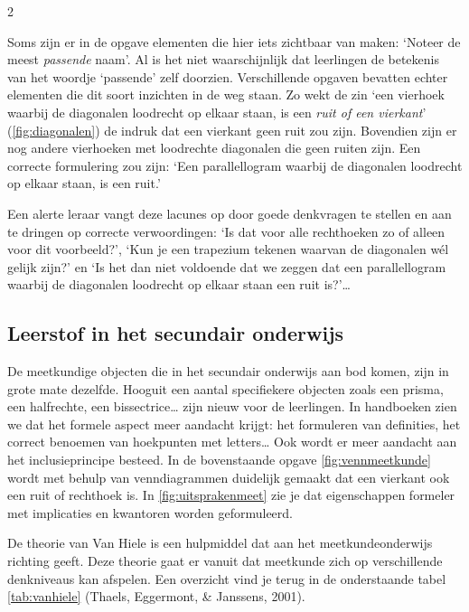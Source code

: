 \begin{multicols}{2}


Soms zijn er in de opgave elementen die hier iets zichtbaar van maken: `Noteer de meest \emph{passende} naam'.
Al is het niet waarschijnlijk dat leerlingen de betekenis van het woordje `passende' zelf doorzien.
Verschillende opgaven bevatten echter elementen die dit soort inzichten in de weg staan.
Zo wekt de zin `een vierhoek waarbij de diagonalen loodrecht op elkaar staan, is een \emph{ruit of een vierkant}' (\autoref{fig:diagonalen}) de indruk dat een vierkant geen ruit zou zijn. Bovendien zijn er nog  andere vierhoeken met loodrechte diagonalen die geen ruiten zijn. Een correcte formulering zou zijn: `Een parallellogram waarbij de diagonalen loodrecht op elkaar staan, is een ruit.'

Een alerte leraar vangt deze lacunes op door goede denkvragen te stellen en aan te dringen op correcte verwoordingen: `Is dat voor alle rechthoeken zo of alleen voor dit voorbeeld?', `Kun je een trapezium tekenen waarvan de diagonalen wél gelijk zijn?' en `Is het dan niet voldoende dat we zeggen dat een parallellogram waarbij de diagonalen loodrecht op elkaar staan een ruit is?'\ldots

\subsection{Leerstof in het secundair onderwijs}
De meetkundige objecten die in het secundair onderwijs aan bod komen, zijn in grote mate dezelfde.
Hooguit een aantal specifiekere objecten zoals een prisma, een halfrechte, een bissectrice\ldots{} zijn nieuw voor de leerlingen.
In handboeken zien we dat het formele aspect meer aandacht krijgt: het formuleren van definities, het correct benoemen van hoekpunten met letters\ldots{}
Ook wordt er meer aandacht aan het inclusieprincipe besteed.
In de bovenstaande opgave \autoref{fig:vennmeetkunde} wordt met behulp van venndiagrammen duidelijk gemaakt dat een vierkant ook een ruit of rechthoek is.
In \autoref{fig:uitsprakenmeet} zie je dat eigenschappen formeler met implicaties en kwantoren worden geformuleerd.

De theorie van Van Hiele is een hulpmiddel dat aan het meetkundeonderwijs richting geeft.
Deze theorie gaat er vanuit dat meetkunde zich op verschillende denkniveaus kan afspelen.
Een overzicht vind je terug in de onderstaande tabel \autoref{tab:vanhiele} (Thaels,
Eggermont, \& Janssens, 2001).

\end{multicols}

